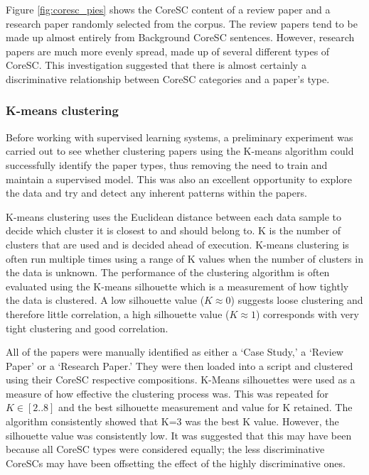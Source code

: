 Figure \ref{fig:coresc_pies} shows the CoreSC content of a review paper and a
research paper randomly selected from the corpus. The review papers tend to be
made up almost entirely from Background CoreSC sentences. However, research
papers are much more evenly spread, made up of several different types of
CoreSC. This investigation suggested that there is almost certainly a discriminative
relationship between CoreSC categories and a paper's type. 

\subsubsection{ K-means clustering}

Before working with supervised learning systems, a preliminary experiment was
carried out to see whether clustering papers using the K-means algorithm could
successfully identify the paper types, thus removing the need to train and
maintain a supervised model. This was also an excellent opportunity to explore
the data and try and detect any inherent patterns within the papers.

K-means clustering uses the Euclidean distance between each data sample to
decide which cluster it is closest to and should belong to. K is the number of
clusters that are used and is decided ahead of execution. K-means clustering is
often run multiple times using a range of K values when the number of clusters
in the data is unknown. The performance of the clustering algorithm is often
evaluated using the K-means silhouette which is a measurement of how tightly
the data is clustered. A low silhouette value ($K \approx 0$) suggests loose
clustering and therefore little correlation, a high silhouette value ($K
\approx 1$) corresponds with very tight clustering and good correlation.

All of the papers were manually identified as either a `Case Study,' a
`Review Paper' or a `Research Paper.' They were then loaded into a script and
clustered using their CoreSC respective compositions. K-Means silhouettes were
used as a measure of how effective the clustering process was. This was
repeated for $ K \in [2..8] $ and the best silhouette measurement and value for
K retained. The algorithm consistently showed that K=3 was the best K value.
However, the silhouette value was consistently low. It was suggested that this
may have been because all CoreSC types were considered equally; the less
discriminative CoreSCs may have been offsetting the effect of the highly
discriminative ones.

